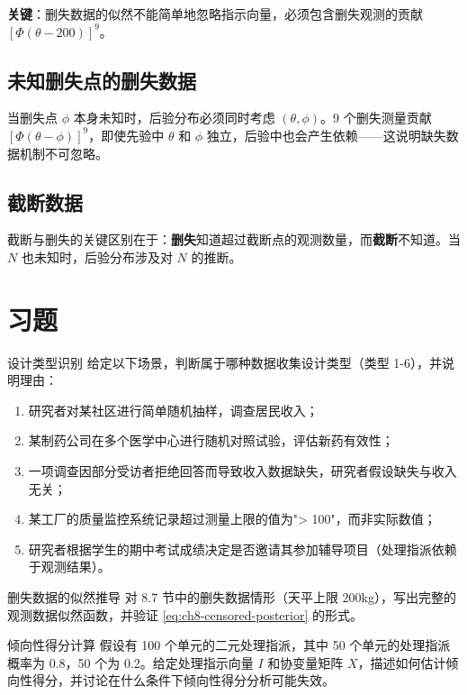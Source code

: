 \textbf{关键}：删失数据的似然不能简单地忽略指示向量，必须包含删失观测的贡献 $[\Phi(\theta-200)]^9$。

\subsection{未知删失点的删失数据}

当删失点 $\phi$ 本身未知时，后验分布必须同时考虑 $(\theta, \phi)$。9 个删失测量贡献 $[\Phi(\theta-\phi)]^9$，即使先验中 $\theta$ 和 $\phi$ 独立，后验中也会产生依赖——这说明缺失数据机制不可忽略。

\subsection{截断数据}

截断与删失的关键区别在于：\textbf{删失}知道超过截断点的观测数量，而\textbf{截断}不知道。当 $N$ 也未知时，后验分布涉及对 $N$ 的推断。

\section{习题}

\begin{Exercise}{设计类型识别}
给定以下场景，判断属于哪种数据收集设计类型（类型 1-6），并说明理由：
\begin{enumerate}
  \item 研究者对某社区进行简单随机抽样，调查居民收入；
  \item 某制药公司在多个医学中心进行随机对照试验，评估新药有效性；
  \item 一项调查因部分受访者拒绝回答而导致收入数据缺失，研究者假设缺失与收入无关；
  \item 某工厂的质量监控系统记录超过测量上限的值为"> 100"，而非实际数值；
  \item 研究者根据学生的期中考试成绩决定是否邀请其参加辅导项目（处理指派依赖于观测结果）。
\end{enumerate}
\end{Exercise}

\begin{Exercise}{删失数据的似然推导}
对 8.7 节中的删失数据情形（天平上限 200kg），写出完整的观测数据似然函数，并验证 \cref{eq:ch8-censored-posterior} 的形式。
\end{Exercise}

\begin{Exercise}{倾向性得分计算}
假设有 100 个单元的二元处理指派，其中 50 个单元的处理指派概率为 0.8，50 个为 0.2。给定处理指示向量 $I$ 和协变量矩阵 $X$，描述如何估计倾向性得分，并讨论在什么条件下倾向性得分分析可能失效。
\end{Exercise}

